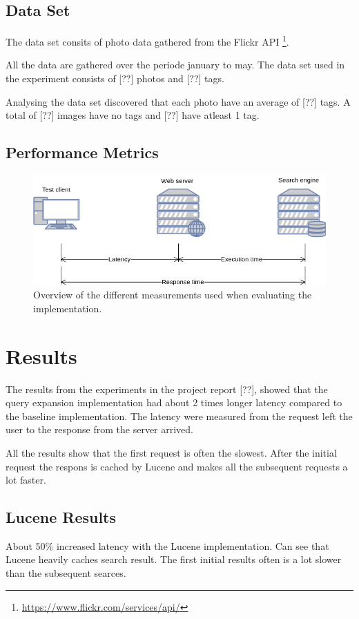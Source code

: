 \subsection{Data Set}
\label{sec:dataset}
The data set consits of photo data gathered from the Flickr API \footnote{\url{https://www.flickr.com/services/api/}}.

All the data are gathered over the periode january to may.
The data set used in the experiment consists of [??] photos and [??] tags.

Analysing the data set discovered that each photo have an average of [??] tags.
A total of [??] images have no tags and [??] have atleast 1 tag.


\subsection{Performance Metrics}

\begin{figure}[h!]
\centering \includegraphics[width=0.9\linewidth]{img/latency-measurements.png}
\caption{Overview of the different measurements used when evaluating the implementation.}
\label{fig:latency-measurements}
\end{figure}

\section{Results}
\label{sec:results}
The results from the experiments in the project report [??],
showed that the query expansion implementation had about 2 times longer latency compared to the baseline implementation.
The latency were measured from the request left the user to the response from the server arrived.

All the results show that the first request is often the slowest.
After the initial request the respons is cached by Lucene and makes all the subsequent requests a lot faster.

\subsection{Lucene Results}
About 50\% increased latency with the Lucene implementation.
Can see that Lucene heavily caches search result.
The first initial results often is a lot slower than the subsequent searces.

